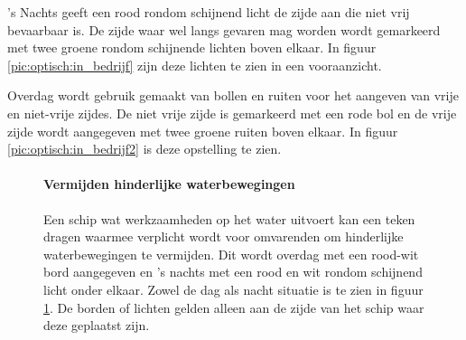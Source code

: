 \vspace{-0.6cm}%
's Nachts geeft een rood rondom schijnend licht de zijde aan die niet vrij bevaarbaar is. De zijde waar wel langs gevaren mag worden wordt gemarkeerd met twee groene rondom schijnende lichten boven elkaar. In figuur \ref{pic:optisch:in_bedrijf} zijn deze lichten te zien in een vooraanzicht.

Overdag wordt gebruik gemaakt van bollen en ruiten voor het aangeven van vrije en niet-vrije zijdes. De niet vrije zijde is gemarkeerd met een rode bol en de vrije zijde wordt aangegeven met twee groene ruiten boven elkaar. In figuur \ref{pic:optisch:in_bedrijf2} is deze opstelling te zien.

\begin{figure}[H]
	\centering
	\begin{minipage}[t]{0.75\textwidth}
		\paragraph{Vermijden hinderlijke waterbewegingen}
		Een schip wat werkzaamheden op het water uitvoert kan een teken dragen waarmee verplicht wordt voor omvarenden om hinderlijke waterbewegingen te vermijden. Dit wordt overdag met een rood-wit bord aangegeven en 's nachts met een rood en wit rondom schijnend licht onder elkaar. Zowel de dag als nacht situatie is te zien in figuur  \ref{pic:optisch:hinder}. De borden of lichten gelden alleen aan de zijde van het schip waar deze geplaatst zijn.
	\end{minipage}
	\hfill
	\begin{minipage}[t]{0.22\textwidth}
		\RemoveLine
		\caption{}
		\label{pic:optisch:hinder}
	\end{minipage}
\end{figure}

